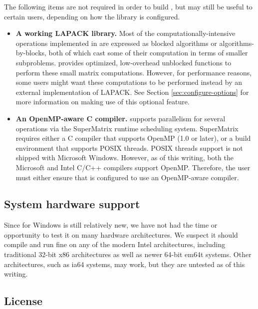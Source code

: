 The following items are not required in order to build \libflamens, but may
still be useful to certain users, depending on how the library is
configured.
\begin{itemize}
\item
{\bf A working LAPACK library.}
Most of the computationally-intensive operations implemented in \libflame
are expressed as blocked algorithms or algorithms-by-blocks, both of which
cast some of their computation in terms of smaller subproblems.
\libflame provides optimized, low-overhead unblocked functions to perform
these small matrix computations.
However, for performance reasons, some users might want these computations
to be performed instead by an external implementation of LAPACK.
See Section \ref{sec:configure-options} for more information on making use of
this optional feature.
\item
{\bf An OpenMP-aware C compiler.}
\libflame supports parallelism for several operations via the SuperMatrix
runtime scheduling system.
SuperMatrix requires either a C compiler that supports OpenMP (1.0 or later),
or a build environment that supports POSIX threads.
POSIX threads support is not shipped with Microsoft Windows.
However, as of this writing, both the Microsoft and Intel C/C++ compilers
support OpenMP.
Therefore, the user must either ensure that \libflame is configured to use 
an OpenMP-aware compiler.
\end{itemize}

\subsection{System hardware support}


Since \libflame for Windows is still relatively new, we have not had the time
or opportunity to test it on many hardware architectures.
We suspect it should compile and run fine on any of the modern Intel
architectures, including traditional 32-bit x86 architectures as well as
newer 64-bit em64t systems.
Other architectures, such as ia64 systems, may work, but they are untested
as of this writing.

\subsection{License}





